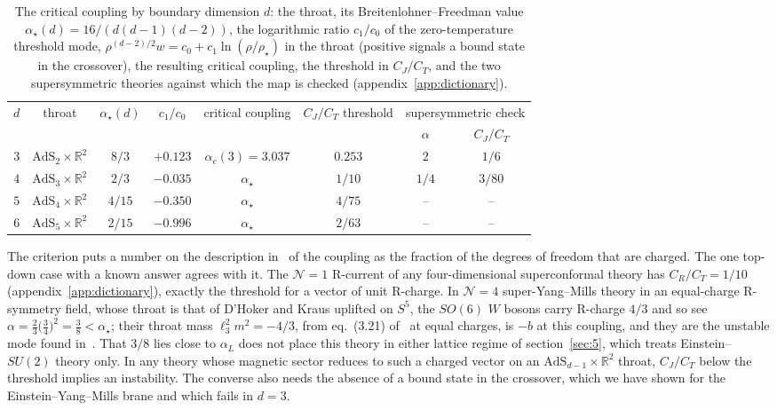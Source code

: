 \begin{table}[t]
\centering
\small
\setlength{\tabcolsep}{4.5pt}
\begin{tabular}{cccccccc}
\toprule
$d$ & throat & $\alpha_\star(d)$ & $c_1/c_0$ & critical coupling & $C_J/C_T$ threshold & \multicolumn{2}{c}{supersymmetric check} \\
 & & & & & & $\alpha$ & $C_J/C_T$ \\
\midrule
$3$ & $\mathrm{AdS}_2 \times \mathbb{R}^2$ & $8/3$ & $+0.123$ & $\alpha_c(3) = 3.037$ & $0.253$ & $2$ & $1/6$ \\
$4$ & $\mathrm{AdS}_3 \times \mathbb{R}^2$ & $2/3$ & $-0.035$ & $\alpha_\star$ & $1/10$ & $1/4$ & $3/80$ \\
$5$ & $\mathrm{AdS}_4 \times \mathbb{R}^2$ & $4/15$ & $-0.350$ & $\alpha_\star$ & $4/75$ & -- & -- \\
$6$ & $\mathrm{AdS}_5 \times \mathbb{R}^2$ & $2/15$ & $-0.996$ & $\alpha_\star$ & $2/63$ & -- & -- \\
\bottomrule
\end{tabular}
\caption{The critical coupling by boundary dimension $d$: the throat, its
Breitenlohner--Freedman value $\alpha_\star(d) = 16/(d(d-1)(d-2))$, the
logarithmic ratio $c_1/c_0$ of the zero-temperature threshold mode,
$\rho^{(d-2)/2}w = c_0 + c_1\ln(\rho/\rho_\star)$ in the throat (positive signals a bound state in the
crossover), the resulting critical coupling, the threshold in $C_J/C_T$, and
the two supersymmetric theories against which the map is checked
(appendix~\ref{app:dictionary}).}
\label{tab:dims}
\end{table}

The criterion puts a number on the description
in~\cite{Ammon:2009xh,Wong:2013rda} of the coupling as the fraction of the
degrees of freedom that are charged. The one top-down case with a known
answer agrees with it. The $\mathcal{N} = 1$ R-current of any
four-dimensional superconformal theory has $C_R/C_T = 1/10$
(appendix~\ref{app:dictionary}), exactly the threshold for a vector of
unit R-charge. In $\mathcal{N} = 4$ super-Yang--Mills theory in an
equal-charge R-symmetry field, whose throat is that of D'Hoker and Kraus
uplifted on $S^5$, the $SO(6)$ $W$ bosons carry R-charge $4/3$ and so see
$\alpha = \tfrac23\big(\tfrac34\big)^2 = \tfrac38 < \alpha_\star$; their
throat mass $\ell_3^2m^2 = -4/3$, from eq.~(3.21) of~\cite{Donos:2011pn} at equal charges, is $-b$ at this
coupling, and they are the unstable mode found
in~\cite{Almuhairi:2011ws,Donos:2011pn}. That $3/8$ lies close to $\alpha_L$
does not place this theory in either lattice regime of section~\ref{sec:5},
which treats Einstein--$SU(2)$ theory only. In any theory whose magnetic
sector reduces to such a charged vector on an
$\mathrm{AdS}_{d-1} \times \mathbb{R}^2$ throat, $C_J/C_T$ below the
threshold implies an instability. The converse also needs the absence of a
bound state in the crossover, which we have shown for the
Einstein--Yang--Mills brane and which fails in $d = 3$.


